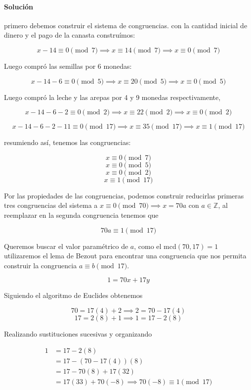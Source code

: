 \documentclass{article}
\begin{document}
	\paragraph{Solución} primero debemos construir el sistema de congruencias. con la cantidad inicial de dinero y el pago de la canasta construímos:
	
	$$x - 14 \equiv 0 \pmod{7} \implies x \equiv 14 \pmod{7} \implies x \equiv 0 \pmod{7}$$
	
	Luego compró las semillas por 6 monedas:
	
	$$x - 14 - 6 \equiv 0 \pmod{5} \implies x \equiv 20 \pmod{5} \implies x \equiv 0 \pmod{5}$$
	
	Luego compró la leche y las arepas por 4 y 9 monedas respectivamente,
	
	$$x - 14 - 6 - 2 \equiv 0 \pmod{2} \implies x \equiv 22 \pmod{2} \implies x \equiv 0 \pmod{2}$$
	
	$$x - 14 - 6 - 2 - 11 \equiv 0 \pmod{17} \implies x \equiv 35 \pmod{17} \implies x \equiv 1 \pmod{17}$$
	
	resumiendo así, tenemos las congruencias:
	
	$$x \equiv 0 \pmod{7}$$
	$$x \equiv 0 \pmod{5}$$
	$$x \equiv 0 \pmod{2}$$
	$$x \equiv 1 \pmod{17}$$
	
	Por las propiedades de las congruencias, podemos construir reducirlas primeras tres congruencias del sistema a $x \equiv 0 \pmod{70} \implies x = 70a$ con $a \in \mathbb{Z}$, al reemplazar en la segunda congruencia tenemos que
	
	$$70a \equiv 1 \pmod{17}$$
	
	Queremos buscar el valor paramétrico de $a$, como el mcd$(70, 17) = 1$ utilizaremos el lema de Bezout para encontrar una congruencia que nos permita construir la congruencia $a \equiv b \pmod{17}$.
	
	$$1 = 70x + 17y$$
	
	Siguiendo el algoritmo de Euclides obtenemos
	
	$$70 = 17(4) + 2 \implies 2 = 70 - 17(4)$$
	$$17 = 2(8) + 1 \implies 1 = 17 - 2(8)$$
	
	Realizando sustituciones sucesivas y organizando
	
	\begin{align*}
	1 &= 17 - 2(8)\\
	&= 17 - (70 - 17(4))(8)\\
	&= 17 - 70(8) + 17(32)\\
	&= 17(33) + 70(-8) \implies 70(-8) \equiv 1 \pmod{17}
	\end{align*}
	
\end{document}
